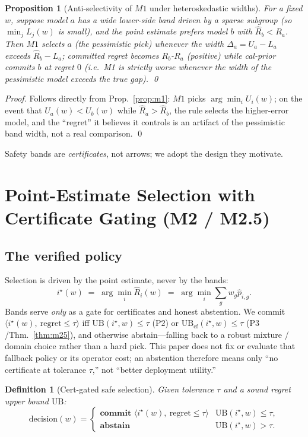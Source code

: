 \documentclass{article}
\newtheorem{proposition}{Proposition}
\newtheorem{definition}{Definition}
\begin{document}
\begin{proposition}[Anti-selectivity of $M1$ under heteroskedastic widths]
\label{prop:m1anti}
For a fixed $w$, suppose model $a$ has a wide lower-side band driven by a sparse subgroup
(so $\min_j L_j(w)$ is small), and the point estimate prefers model $b$ with $\hat R_b<R_a$.
Then $M1$ selects $a$ (the pessimistic pick) whenever the width
$\Delta_a=U_a-L_a$ exceeds $\hat R_b-L_a$; committed regret becomes
$R_b$-$R_a$ (positive) while cal-prior commits $b$ at regret $0$ (i.e.~M1 is strictly
worse whenever the width of the pessimistic model exceeds the true gap). \qed
\end{proposition}
\begin{proof}
Follows directly from Prop.~\ref{prop:m1}: $M1$ picks $\arg\min_i U_i(w)$; on the event that
$U_a(w)<U_b(w)$ while $\hat R_a>\hat R_b$, the rule selects the higher-error model, and the
``regret'' it believes it controls is an artifact of the pessimistic band width, not a real
comparison. \qed
\end{proof}

Safety bands are \emph{certificates}, not arrows; we adopt the design they motivate.

\section{Point-Estimate Selection with Certificate Gating (M2 / M2.5)}
\label{sec:m2}

\subsection{The verified policy}
Selection is driven by the point estimate, never by the bands:
\[
  i^\star(w)\;=\;\arg\min_i \hat R_i(w)\;=\;\arg\min_i \textstyle\sum_g w_g \hat p_{i,g}.
\]
Bands serve \emph{only} as a gate for certificates and honest abstention. We commit
$\langle i^\star(w),\ \mathrm{regret}\le\tau\rangle$ iff $\mathrm{UB}(i^\star,w)\le\tau$
($\mathrm{P2}$) or $\mathrm{UB}_{\mathrm{cf}}(i^\star,w)\le\tau$ ($\mathrm{P3}$/Thm.~\ref{thm:m25}),
and otherwise abstain---falling back to a robust mixture / domain choice rather than a hard
pick. This paper does not fix or evaluate that fallback policy or its operator cost; an
abstention therefore means only ``no certificate at tolerance $\tau$,'' not ``better
deployment utility.''

\begin{definition}[Cert-gated safe selection]
\label{def:gated}
Given tolerance $\tau$ and a sound regret upper bound $\mathrm{UB}$:
\[
  \mathrm{decision}(w)=\begin{cases}
    \textbf{commit }\langle i^\star(w),\ \mathrm{regret}\le\tau\rangle &
      \mathrm{UB}(i^\star,w)\le\tau,\\
    \textbf{abstain} & \mathrm{UB}(i^\star,w)>\tau.
  \end{cases}
\]
\end{definition}
\end{document}
